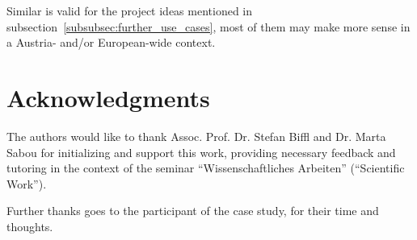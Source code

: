 Similar is valid for the project ideas mentioned in subsection~\ref{subsubsec:further_use_cases}, most of them may make more sense in a Austria- and/or European-wide context.


\section{Acknowledgments}
The authors would like to thank Assoc. Prof. Dr. Stefan Biffl and Dr. Marta Sabou for initializing and support this work, providing necessary feedback and 	tutoring in the context of the seminar ``Wissenschaftliches Arbeiten'' (``Scientific Work'').

Further thanks goes to the participant of the case study, for their time and thoughts.
